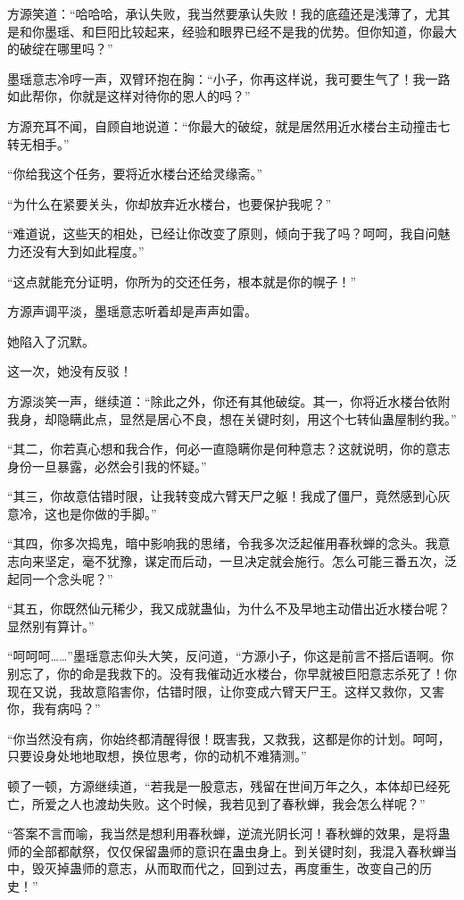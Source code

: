 \begin{this_body}
方源笑道：“哈哈哈，承认失败，我当然要承认失败！我的底蕴还是浅薄了，尤其是和你墨瑶、和巨阳比较起来，经验和眼界已经不是我的优势。但你知道，你最大的破绽在哪里吗？”

墨瑶意志冷哼一声，双臂环抱在胸：“小子，你再这样说，我可要生气了！我一路如此帮你，你就是这样对待你的恩人的吗？”

方源充耳不闻，自顾自地说道：“你最大的破绽，就是居然用近水楼台主动撞击七转无相手。”

“你给我这个任务，要将近水楼台还给灵缘斋。”

“为什么在紧要关头，你却放弃近水楼台，也要保护我呢？”

“难道说，这些天的相处，已经让你改变了原则，倾向于我了吗？呵呵，我自问魅力还没有大到如此程度。”

“这点就能充分证明，你所为的交还任务，根本就是你的幌子！”

方源声调平淡，墨瑶意志听着却是声声如雷。

她陷入了沉默。

这一次，她没有反驳！

方源淡笑一声，继续道：“除此之外，你还有其他破绽。其一，你将近水楼台依附我身，却隐瞒此点，显然是居心不良，想在关键时刻，用这个七转仙蛊屋制约我。”

“其二，你若真心想和我合作，何必一直隐瞒你是何种意志？这就说明，你的意志身份一旦暴露，必然会引我的怀疑。”

“其三，你故意估错时限，让我转变成六臂天尸之躯！我成了僵尸，竟然感到心灰意冷，这也是你做的手脚。”

“其四，你多次捣鬼，暗中影响我的思绪，令我多次泛起催用春秋蝉的念头。我意志向来坚定，毫不犹豫，谋定而后动，一旦决定就会施行。怎么可能三番五次，泛起同一个念头呢？”

“其五，你既然仙元稀少，我又成就蛊仙，为什么不及早地主动借出近水楼台呢？显然别有算计。”

“呵呵呵……”墨瑶意志仰头大笑，反问道，“方源小子，你这是前言不搭后语啊。你别忘了，你的命是我救下的。没有我催动近水楼台，你早就被巨阳意志杀死了！你现在又说，我故意陷害你，估错时限，让你变成六臂天尸王。这样又救你，又害你，我有病吗？”

“你当然没有病，你始终都清醒得很！既害我，又救我，这都是你的计划。呵呵，只要设身处地地取想，换位思考，你的动机不难猜测。”

顿了一顿，方源继续道，“若我是一股意志，残留在世间万年之久，本体却已经死亡，所爱之人也渡劫失败。这个时候，我若见到了春秋蝉，我会怎么样呢？”

“答案不言而喻，我当然是想利用春秋蝉，逆流光阴长河！春秋蝉的效果，是将蛊师的全部都献祭，仅仅保留蛊师的意识在蛊虫身上。到关键时刻，我混入春秋蝉当中，毁灭掉蛊师的意志，从而取而代之，回到过去，再度重生，改变自己的历史！”


\end{this_body}
